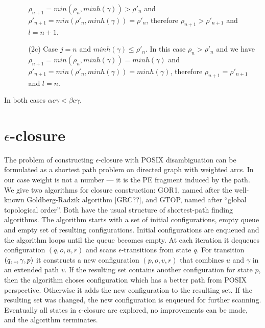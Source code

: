 \documentclass[AMA,STIX1COL]{WileyNJD-v2}
\newcommand{\Xund}{\rule{.4em}{.4pt}}
\begin{document}
\begin{proofEnd}
\begin{itemize}[itemsep=0.5em, topsep=0.5em]
\begin{itemize}
            $\rho_{n+1} = min(\rho_n, minh(\gamma)) > \rho'_n$ and
            $\rho'_{n+1} = min(\rho'_n, minh(\gamma)) = \rho'_n$,
            therefore $\rho_{n+1} > \rho'_{n+1}$
            and $l = n + 1$.
        \item[(2c)]
            Case $j = n$ and $minh(\gamma) \leq \rho'_n$.
            In this case $\rho_n > \rho'_n$ and we have
            $\rho_{n+1} = min(\rho_n, minh(\gamma)) = minh(\gamma)$ and
            $\rho'_{n+1} = min(\rho'_n, minh(\gamma)) = minh(\gamma)$,
            therefore $\rho_{n+1} = \rho'_{n+1}$
            and $l = n$.
        \end{itemize}
    \end{itemize}
    In both cases $\alpha c \gamma < \beta c \gamma$.
\end{proofEnd}


\section{$\epsilon$-closure}\label{section_closure}

The problem of constructing $\epsilon$-closure with POSIX disambiguation
can be formulated as a shortest path problem on directed graph with weighted arcs.
In our case weight is not a number --- it is the PE fragment induced by the path.
%
We give two algorithms for closure construction: GOR1, named after the well-known Goldberg-Radzik algorithm [GRC??],
and GTOP, named after ``global topological order''.
%
Both have the usual structure of shortest-path finding algorithms.
The algorithm starts with a set of initial configurations, empty queue and empty set of resulting configurations.
Initial configurations are enqueued and the algorithm loops until the queue becomes empty.
At each iteration it dequeues configuration $(q, o, u, r)$ and scans $\epsilon$-transitions from state $q$.
For transition $(q, \Xund, \gamma, p)$ it constructs a new configuration $(p, o, v, r)$
that combines $u$ and $\gamma$ in an extended path $v$.
If the resulting set contains another configuration for state $p$,
then the algorithm choses configuration which has a better path from POSIX perspective.
Otherwise it adds the new configuration to the resulting set.
If the resulting set was changed, the new configuration is enqueued for further scanning.
Eventually all states in $\epsilon$-closure are explored, no improvements can be made, and the algorithm terminates.
%
\\
\end{document}
